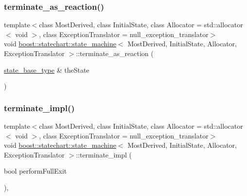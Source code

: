 \subsubsection{\texorpdfstring{terminate\+\_\+as\+\_\+reaction()}{terminate\_as\_reaction()}}
{\footnotesize\ttfamily template$<$class Most\+Derived, class Initial\+State, class Allocator = std\+::allocator$<$ void $>$, class Exception\+Translator = null\+\_\+exception\+\_\+translator$>$ \\
void \mbox{\hyperlink{classboost_1_1statechart_1_1state__machine}{boost\+::statechart\+::state\+\_\+machine}}$<$ Most\+Derived, Initial\+State, Allocator, Exception\+Translator $>$\+::terminate\+\_\+as\+\_\+reaction (\begin{DoxyParamCaption}\item[{\mbox{\hyperlink{classboost_1_1statechart_1_1state__machine_a69cc258c29fcabec25c5dc8bedb7d530}{state\+\_\+base\+\_\+type}} \&}]{the\+State }\end{DoxyParamCaption})\hspace{0.3cm}{\ttfamily [inline]}}

\mbox{\label{classboost_1_1statechart_1_1state__machine_a74a1650e45e284366802f9709b15cf31}} 
\subsubsection{\texorpdfstring{terminate\+\_\+impl()}{terminate\_impl()}\hspace{0.1cm}{\footnotesize\ttfamily [1/2]}}
{\footnotesize\ttfamily template$<$class Most\+Derived, class Initial\+State, class Allocator = std\+::allocator$<$ void $>$, class Exception\+Translator = null\+\_\+exception\+\_\+translator$>$ \\
void \mbox{\hyperlink{classboost_1_1statechart_1_1state__machine}{boost\+::statechart\+::state\+\_\+machine}}$<$ Most\+Derived, Initial\+State, Allocator, Exception\+Translator $>$\+::terminate\+\_\+impl (\begin{DoxyParamCaption}\item[{bool}]{perform\+Full\+Exit }\end{DoxyParamCaption})\hspace{0.3cm}{\ttfamily [inline]}, {\ttfamily [private]}}

